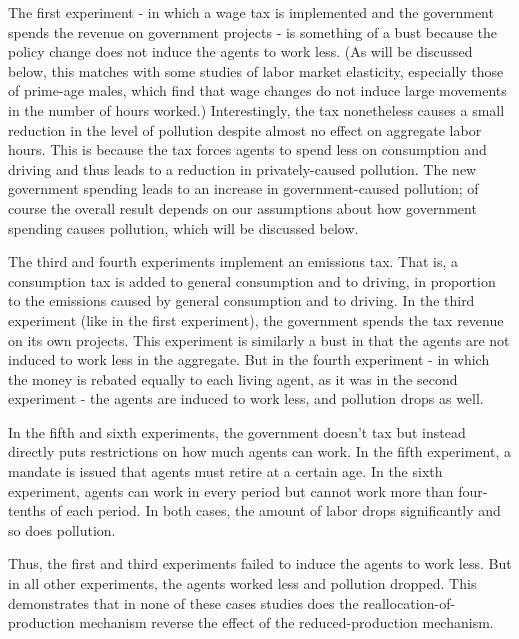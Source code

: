 \documentclass[letter, 12pt, epsf,leqno]{article}
\begin{document}
The first experiment - in which a wage tax is implemented and the government spends the revenue on government projects - is something of a bust because the policy change does not induce the agents to work less.  (As will be discussed below, this matches with some studies of labor market elasticity, especially those of prime-age males, which find that wage changes do not induce large movements in the number of hours worked.)  Interestingly, the tax nonetheless causes a small reduction in the level of pollution despite almost no effect on aggregate labor hours.  This is because the tax forces agents to spend less on consumption and driving and thus leads to a reduction in privately-caused pollution.  The new government spending leads to an increase in government-caused pollution; of course the overall result depends on our assumptions about how government spending causes pollution, which will be discussed below.

The third and fourth experiments implement an emissions tax.  That is, a consumption tax is added to general consumption and to driving, in proportion to the emissions caused by general consumption and to driving.  In the third experiment (like in the first experiment), the government spends the tax revenue on its own projects.  This experiment is similarly a bust in that the agents are not induced to work less in the aggregate.  But in the fourth experiment - in which the money is rebated equally to each living agent, as it was in the second experiment - the agents are induced to work less, and pollution drops as well.

In the fifth and sixth experiments, the government doesn't tax but instead directly puts restrictions on how much agents can work.  In the fifth experiment, a mandate is issued that agents must retire at a certain age.  In the sixth experiment, agents can work in every period but cannot work more than four-tenths of each period.  In both cases, the amount of labor drops significantly and so does pollution. 

Thus, the first and third experiments failed to induce the agents to work less.  But in all other experiments, the agents worked less and pollution dropped.  This demonstrates that in none of these cases studies does the reallocation-of-production mechanism reverse the effect of the reduced-production mechanism.  %
\end{document}
